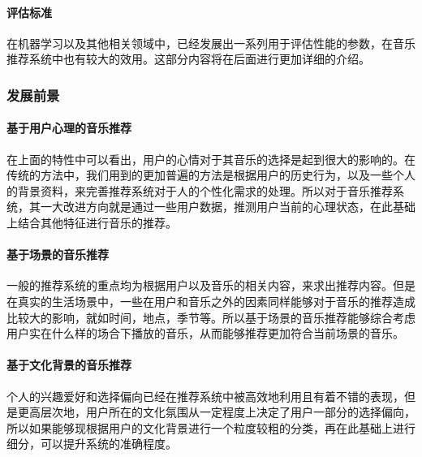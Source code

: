 \paragraph{评估标准}
在机器学习以及其他相关领域中，已经发展出一系列用于评估性能的参数，在音乐推荐系统中也有较大的效用。这部分内容将在后面进行更加详细的介绍。

\subsubsection{发展前景}
\paragraph{基于用户心理的音乐推荐}
在上面的特性中可以看出，用户的心情对于其音乐的选择是起到很大的影响的\cite{EmotionInflunce}。在传统的方法中，我们用到的更加普遍的方法是根据用户的历史行为，以及一些个人的背景资料，来完善推荐系统对于人的个性化需求的处理。所以对于音乐推荐系统，其一大改进方向就是通过一些用户数据，推测用户当前的心理状态，在此基础上结合其他特征进行音乐的推荐。

\paragraph{基于场景的音乐推荐}
一般的推荐系统的重点均为根据用户以及音乐的相关内容，来求出推荐内容。但是在真实的生活场景中，一些在用户和音乐之外的因素同样能够对于音乐的推荐造成比较大的影响，就如时间\cite{TimeInflunce}，地点\cite{Location}，季节\cite{Season}等。所以基于场景的音乐推荐能够综合考虑用户实在什么样的场合下播放的音乐，从而能够推荐更加符合当前场景的音乐。

\paragraph{基于文化背景的音乐推荐}
个人的兴趣爱好和选择偏向已经在推荐系统中被高效地利用且有着不错的表现，但是更高层次地，用户所在的文化氛围从一定程度上决定了用户一部分的选择偏向\cite{Culture}，所以如果能够现根据用户的文化背景进行一个粒度较粗的分类，再在此基础上进行细分，可以提升系统的准确程度。